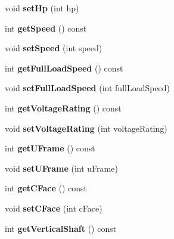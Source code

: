 \begin{DoxyCompactItemize}
void {\bfseries set\+Hp} (int hp)
\item 
\mbox{\label{class_motor_data_a0385467a61f357c7d10fd70e22372afb}} 
int {\bfseries get\+Speed} () const
\item 
\mbox{\label{class_motor_data_a27f9f3513065e478edcf0342938059ec}} 
void {\bfseries set\+Speed} (int speed)
\item 
\mbox{\label{class_motor_data_ad1ba66ba5af859acaea57a91a7916626}} 
int {\bfseries get\+Full\+Load\+Speed} () const
\item 
\mbox{\label{class_motor_data_af6c25bd37ff58634fcf4885ada9fc1d1}} 
void {\bfseries set\+Full\+Load\+Speed} (int full\+Load\+Speed)
\item 
\mbox{\label{class_motor_data_a3ede25b7319b0d58af591c7737a56c43}} 
int {\bfseries get\+Voltage\+Rating} () const
\item 
\mbox{\label{class_motor_data_a335c9f5f1326dbf28bd9d7a652949d1f}} 
void {\bfseries set\+Voltage\+Rating} (int voltage\+Rating)
\item 
\mbox{\label{class_motor_data_aaee859b8d0bebd675a696e710efc3c35}} 
int {\bfseries get\+U\+Frame} () const
\item 
\mbox{\label{class_motor_data_a34fdfe66af559bb3d8e619b13d9dae11}} 
void {\bfseries set\+U\+Frame} (int u\+Frame)
\item 
\mbox{\label{class_motor_data_aefee8283ca18117b6272ab70e183dcec}} 
int {\bfseries get\+C\+Face} () const
\item 
\mbox{\label{class_motor_data_ae58247551e510b76ef28e56b7296b5b9}} 
void {\bfseries set\+C\+Face} (int c\+Face)
\item 
\mbox{\label{class_motor_data_a585d6ab659268e3bab059ef9d93eb46b}} 
int {\bfseries get\+Vertical\+Shaft} () const
\item 
\mbox{\label{class_motor_data_ae4fa754b2e93bcc16c7385d44e11c23c}} 

\end{DoxyCompactItemize}
